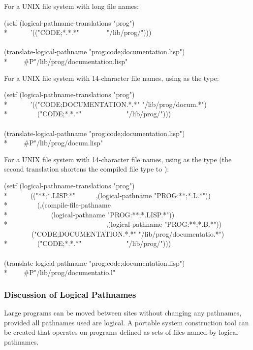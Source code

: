 \begin{newer}
For a UNIX file system with long file names:
\begin{lisp}
(setf (logical-pathname-translations "prog") \\*
~~~~~~'(("CODE;*.*.*"~~~~~~~~"/lib/prog/"))) \\
\\
(translate-logical-pathname "prog:code;documentation.lisp") \\*
~~~\EV\ \#P"/lib/prog/documentation.lisp"
\end{lisp}
For a UNIX file system with 14-character file names, using  as the type:
\begin{lisp}
(setf (logical-pathname-translations "prog") \\*
~~~~~~'(("CODE;DOCUMENTATION.*.*" "/lib/prog/docum.*") \\*
~~~~~~~~("CODE;*.*.*"~~~~~~~~~~~~~"/lib/prog/"))) \\
\\
(translate-logical-pathname "prog:code;documentation.lisp") \\*
~~~\EV\ \#P"/lib/prog/docum.lisp"
\end{lisp}
For a UNIX file system with 14-character file names, using  as the type
(the second translation shortens the compiled file type to ):
\begin{lisp}
(setf (logical-pathname-translations "prog") \\*
~~~~~~{\Xbq}(("**;*.LISP.*"~~~~~~,(logical-pathname "PROG:**;*.L.*")) \\*
~~~~~~~~(,(compile-file-pathname \\*
~~~~~~~~~~~~(logical-pathname "PROG:**;*.LISP.*")) \\*
~~~~~~~~~~~~~~~~~~~~~~~~~~~~,(logical-pathname "PROG:**;*.B.*")) \\
~~~~~~~~("CODE;DOCUMENTATION.*.*" "/lib/prog/documentatio.*") \\*
~~~~~~~~("CODE;*.*.*"~~~~~~~~~~~~~"/lib/prog/"))) \\
\\
(translate-logical-pathname "prog:code;documentation.lisp") \\*
~~~\EV\ \#P"/lib/prog/documentatio.l"
\end{lisp}

\subsubsection{Discussion of Logical Pathnames}

  Large programs can be moved between sites without changing any
  pathnames, provided all pathnames used are logical.  A portable system
  construction tool can be created that operates on programs defined as
  sets of files named by logical pathnames.


\end{newer}
